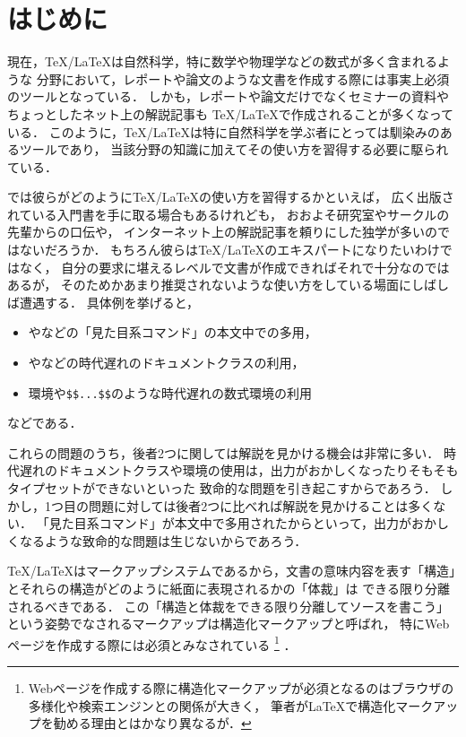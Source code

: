 \chapter{はじめに}

現在，{\TeX}/{\LaTeX}は自然科学，特に数学や物理学などの数式が多く含まれるような
分野において，レポートや論文のような文書を作成する際には事実上必須のツールとなっている．
しかも，レポートや論文だけでなくセミナーの資料やちょっとしたネット上の解説記事も
{\TeX}/{\LaTeX}で作成されることが多くなっている．
このように，{\TeX}/{\LaTeX}は特に自然科学を学ぶ者にとっては馴染みのあるツールであり，
当該分野の知識に加えてその使い方を習得する必要に駆られている．

では彼らがどのように{\TeX}/{\LaTeX}の使い方を習得するかといえば，
広く出版されている入門書を手に取る場合もあるけれども，
おおよそ研究室やサークルの先輩からの口伝や，
インターネット上の解説記事を頼りにした独学が多いのではないだろうか．
もちろん彼らは{\TeX}/{\LaTeX}のエキスパートになりたいわけではなく，
自分の要求に堪えるレベルで文書が作成できればそれで十分なのではあるが，
そのためかあまり推奨されないような使い方をしている場面にしばしば遭遇する．
具体例を挙げると，
\begin{itemize}
	\item {}やなどの「見た目系コマンド」の本文中での多用，
	\item {}やなどの時代遅れのドキュメントクラスの利用，
	\item {}環境や\lstinline{$$...$$}のような時代遅れの数式環境の利用
\end{itemize}
などである．

これらの問題のうち，後者2つに関しては解説を見かける機会は非常に多い．
時代遅れのドキュメントクラスや環境の使用は，出力がおかしくなったりそもそもタイプセットができないといった
致命的な問題を引き起こすからであろう．
しかし，1つ目の問題に対しては後者2つに比べれば解説を見かけることは多くない．
「見た目系コマンド」が本文中で多用されたからといって，出力がおかしくなるような致命的な問題は生じないからであろう．

{\TeX}/{\LaTeX}はマークアップシステムであるから，文書の意味内容を表す「構造」とそれらの構造がどのように紙面に表現されるかの「体裁」は
できる限り分離されるべきである．
この「構造と体裁をできる限り分離してソースを書こう」という姿勢でなされるマークアップは構造化マークアップと呼ばれ，
特にWebページを作成する際には必須とみなされている%
\footnote{%
Webページを作成する際に構造化マークアップが必須となるのはブラウザの多様化や検索エンジンとの関係が大きく，
筆者が{\LaTeX}で構造化マークアップを勧める理由とはかなり異なるが．
}%
．

